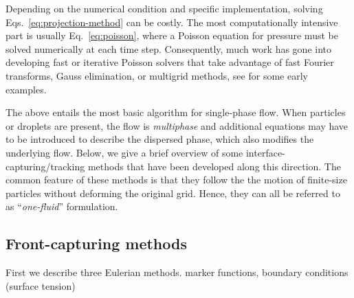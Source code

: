 Depending on the numerical condition and specific implementation, solving Eqs.\ \eqref{eq:projection-method} can be costly. The most computationally intensive part is usually Eq.\ \eqref{eq:poisson}, where a Poisson equation for pressure must be solved numerically at each time step. Consequently, much work has gone into developing fast or iterative Poisson solvers that take advantage of fast Fourier transforms, Gauss elimination, or multigrid methods, see \cite{Buzbee_Golub_Nielson, Swarztrauber1977, multigrid_Brandt, Wesseling} for some early examples.

The above entails the most basic algorithm for single-phase flow.
When particles or droplets are present, the flow is \emph{multiphase} and additional equations may have to be introduced to describe the dispersed phase, which also modifies the underlying flow.
Below, we give a brief overview of some interface-capturing/tracking methods that have been developed along this direction.
The common feature of these methods is that they follow the the motion of finite-size particles without deforming the original grid.
Hence, they can all be referred to as ``\emph{one-fluid}'' formulation.


\subsection{Front-capturing methods}

First we describe three Eulerian methods.
marker functions, boundary conditions (surface tension) \citep{Brackbill_JCP_1992}


\medskip
